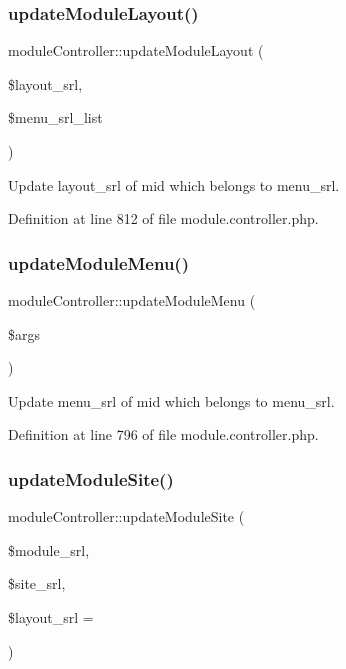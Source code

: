 \subsubsection{\texorpdfstring{update\+Module\+Layout()}{updateModuleLayout()}}
{\footnotesize\ttfamily module\+Controller\+::update\+Module\+Layout (\begin{DoxyParamCaption}\item[{}]{\$layout\+\_\+srl,  }\item[{}]{\$menu\+\_\+srl\+\_\+list }\end{DoxyParamCaption})}



Update layout\+\_\+srl of mid which belongs to menu\+\_\+srl. 



Definition at line 812 of file module.\+controller.\+php.

\hypertarget{classmoduleController_a7583bb9beb47ba3ecc1149546716e9f7}{}\label{classmoduleController_a7583bb9beb47ba3ecc1149546716e9f7} 
\subsubsection{\texorpdfstring{update\+Module\+Menu()}{updateModuleMenu()}}
{\footnotesize\ttfamily module\+Controller\+::update\+Module\+Menu (\begin{DoxyParamCaption}\item[{}]{\$args }\end{DoxyParamCaption})}



Update menu\+\_\+srl of mid which belongs to menu\+\_\+srl. 



Definition at line 796 of file module.\+controller.\+php.

\hypertarget{classmoduleController_a9b1b3b8db4047c33882a9231c5eafb13}{}\label{classmoduleController_a9b1b3b8db4047c33882a9231c5eafb13} 
\subsubsection{\texorpdfstring{update\+Module\+Site()}{updateModuleSite()}}
{\footnotesize\ttfamily module\+Controller\+::update\+Module\+Site (\begin{DoxyParamCaption}\item[{}]{\$module\+\_\+srl,  }\item[{}]{\$site\+\_\+srl,  }\item[{}]{\$layout\+\_\+srl = {} }\end{DoxyParamCaption})}



